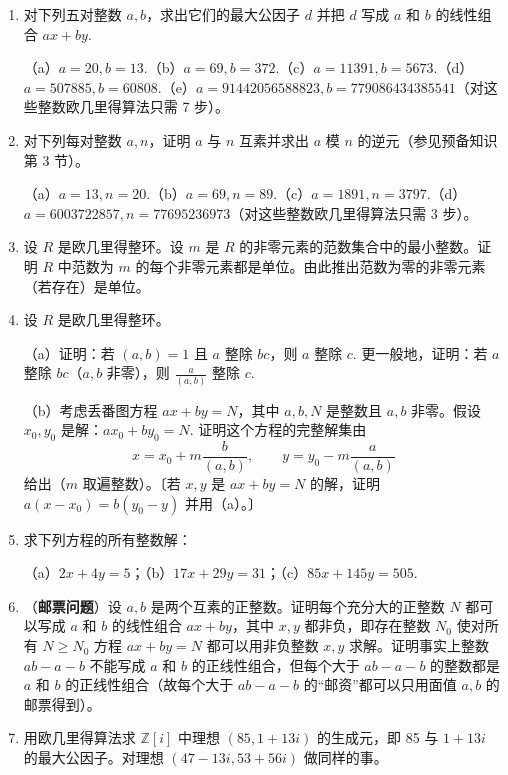 \begin{enumerate}
\item 对下列五对整数 \(a, b\)，求出它们的最大公因子 \(d\) 并把 \(d\) 写成 \(a\) 和 \(b\) 的线性组合 \(ax+by\).

（a）\(a = 20, b = 13\).（b）\(a = 69, b = 372\).（c）\(a = 11391, b = 5673\).（d）\(a = 507885, b = 60808\).（e）\(a = 91442056588823, b = 779086434385541\)（对这些整数欧几里得算法只需 7 步）。

\item 对下列每对整数 \(a, n\)，证明 \(a\) 与 \(n\) 互素并求出 \(a\) 模 \(n\) 的逆元（参见预备知识第 3 节）。

（a）\(a = 13, n = 20\).（b）\(a = 69, n = 89\).（c）\(a = 1891, n = 3797\).（d）\(a = 6003722857, n = 77695236973\)（对这些整数欧几里得算法只需 3 步）。

\item 设 \(R\) 是欧几里得整环。设 \(m\) 是 \(R\) 的非零元素的范数集合中的最小整数。证明 \(R\) 中范数为 \(m\) 的每个非零元素都是单位。由此推出范数为零的非零元素（若存在）是单位。

\item 设 \(R\) 是欧几里得整环。

（a）证明：若 \((a, b) = 1\) 且 \(a\) 整除 \(bc\)，则 \(a\) 整除 \(c\). 更一般地，证明：若 \(a\) 整除 \(bc\)（\(a, b\) 非零），则 \(\frac{a}{(a, b)}\) 整除 \(c\).

（b）考虑丢番图方程 \(ax + by = N\)，其中 \(a, b, N\) 是整数且 \(a, b\) 非零。假设 \(x_0, y_0\) 是解：\(ax_0 + by_0 = N\). 证明这个方程的完整解集由
\[
x = x_0 + m\frac{b}{(a, b)}, \qquad y = y_0 - m\frac{a}{(a, b)}
\]
给出（\(m\) 取遍整数）。〔若 \(x, y\) 是 \(ax + by = N\) 的解，证明 \(a(x-x_0) = b(y_0-y)\) 并用（a）。〕

\item 求下列方程的所有整数解：

（a）\(2x + 4y = 5\)；（b）\(17x + 29y = 31\)；（c）\(85x + 145y = 505\).

\item （\textbf{邮票问题}）设 \(a, b\) 是两个互素的正整数。证明每个充分大的正整数 \(N\) 都可以写成 \(a\) 和 \(b\) 的线性组合 \(ax + by\)，其中 \(x, y\) 都非负，即存在整数 \(N_0\) 使对所有 \(N \geq N_0\) 方程 \(ax + by = N\) 都可以用非负整数 \(x, y\) 求解。证明事实上整数 \(ab - a - b\) 不能写成 \(a\) 和 \(b\) 的正线性组合，但每个大于 \(ab-a-b\) 的整数都是 \(a\) 和 \(b\) 的正线性组合（故每个大于 \(ab-a-b\) 的“邮资”都可以只用面值 \(a, b\) 的邮票得到）。

\item 用欧几里得算法求 \(\mathbb{Z}[i]\) 中理想 \((85, 1+13i)\) 的生成元，即 85 与 \(1+13i\) 的最大公因子。对理想 \((47-13i, 53+56i)\) 做同样的事。


\end{enumerate}
